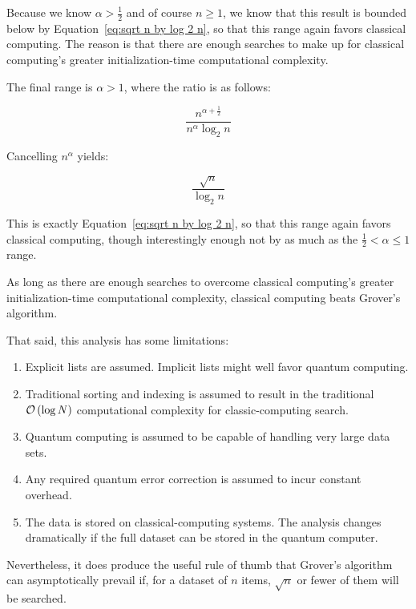 Because we know $\alpha > \frac{1}{2}$ and of course $n \geq 1$,
we know that this result is bounded below by
Equation~\ref{eq:sqrt n by log 2 n}, so that this range again
favors classical computing.
The reason is that there are enough searches to make up for
classical computing's greater initialization-time computational
complexity.

The final range is $\alpha > 1$, where the ratio is as follows:

\begin{equation}
	\frac{n^{\alpha + \frac{1}{2}}}{n^\alpha \log_2 n}
\end{equation}

Cancelling $n^\alpha$ yields:

\begin{equation}
	\frac{\sqrt n}{\log_2 n}
\end{equation}

This is exactly
Equation~\ref{eq:sqrt n by log 2 n}, so that this range again
favors classical computing, though interestingly enough not by
as much as the 
$\frac{1}{2} < \alpha \leq 1$ range.

As long as there are enough searches to overcome classical computing's
greater initialization-time computational complexity, classical computing
beats Grover's algorithm.

That said, this analysis has some limitations:

\begin{enumerate}
\item	Explicit lists are assumed.
	Implicit lists might well favor quantum computing.
\item	Traditional sorting and indexing is assumed to result in
	the traditional $\mathcal{O}\left(\log N\right)$ computational complexity for
	classic-computing search.
\item	Quantum computing is assumed to be capable of handling
	very large data sets.
\item	Any required quantum error correction is assumed to incur
	constant overhead.
\item	The data is stored on classical-computing systems.
	The analysis changes dramatically if the full dataset
	can be stored in the quantum computer.
\end{enumerate}

Nevertheless, it does produce the useful rule of thumb that Grover's
algorithm can asymptotically prevail if, for a dataset of $n$ items,
$\sqrt n$ or fewer of them will be searched.

